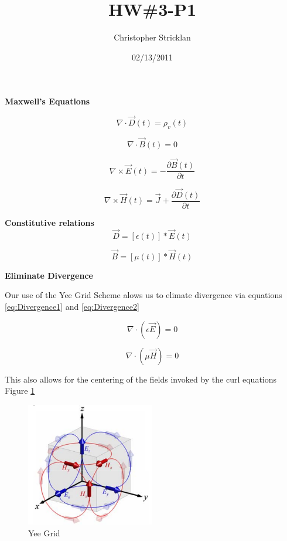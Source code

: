 \documentclass[a4paper,10pt]{article}
\title{HW\#3-P1}
\author{Christopher Stricklan}
\date{02/13/2011}
\begin{document}
\textbf{Maxwell's Equations}

\begin{equation}
  \nabla \cdot \vec{D}(t)=\rho_{v}(t)
\end{equation}

\begin{equation}
  \nabla \cdot \vec{B}(t)=0
\end{equation}

\begin{equation}
  \nabla \times \vec{E}(t) = -\frac{\partial \vec{B}(t)}{\partial t}
\end{equation}

\begin{equation}
  \nabla \times \vec{H}(t) = \vec{J} + \frac{\partial\vec{D}(t)}{\partial t}
\end{equation}
                                                                                   

\textbf{Constitutive relations}
\begin{equation}
  \label{eq:constitutive1}
  \vec{D} = [\epsilon(t)]*\vec{E}(t)
\end{equation}

\begin{equation}
  \label{eq:constitutive2}
  \vec{B} = [\mu(t)]*\vec{H}(t)
\end{equation}


\textbf{Eliminate Divergence}

Our use of the Yee Grid Scheme alows us to elimate divergence via equations \eqref{eq:Divergence1} and \eqref{eq:Divergence2}

\begin{equation} 
  \label{eq:Divergence1}
  \nabla \cdot (\epsilon\vec{E}) = 0
\end{equation}

\begin{equation} 
  \label{eq:Divergence2}
  \nabla \cdot(\mu\vec{H}) = 0
\end{equation}

This also allows for the centering of the fields invoked by the curl equations Figure \ref{fig:YeeGridWithCurls}

\begin{figure}[h]
  \centering
    \includegraphics[width=0.5\textwidth]{YeeGrid.png}
  \caption{Yee Grid}
  \label{fig:YeeGridWithCurls}
\end{figure}
	
\end{document}
